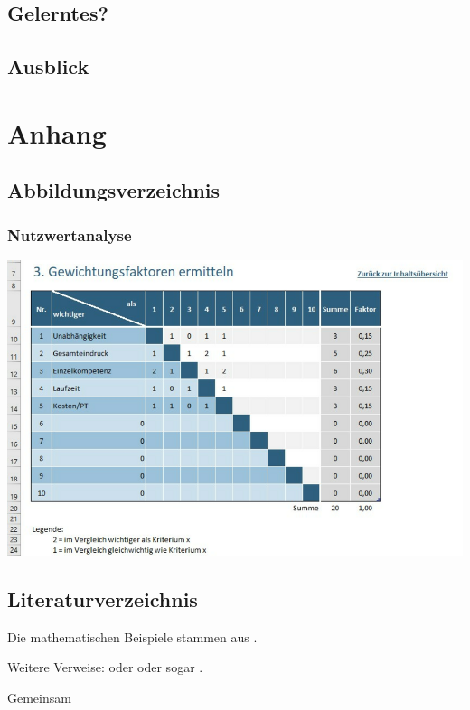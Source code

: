 \documentclass{article}
\begin{document}
\subsection{Gelerntes?}

\subsection{Ausblick}

\section{Anhang}

\subsection{Abbildungsverzeichnis}

\subsubsection{Nutzwertanalyse}
\begin{center}
	\centering
	\includegraphics[scale=0.2]{nutz}
	\label{fig:nutz}
\end{center}

\subsection{Literaturverzeichnis}
Die mathematischen Beispiele stammen aus \autocite{Graham1995}.

Weitere Verweise: \parencite{Graham1995} oder \textcite{Thomas2008} oder sogar
.

\autocite[56]{Thomas2008}

\autocite[Siehe][45-48]{Graham1995}

Gemeinsam \autocite{Graham1995,Thomas2008}

\printbibliography
\end{document}
